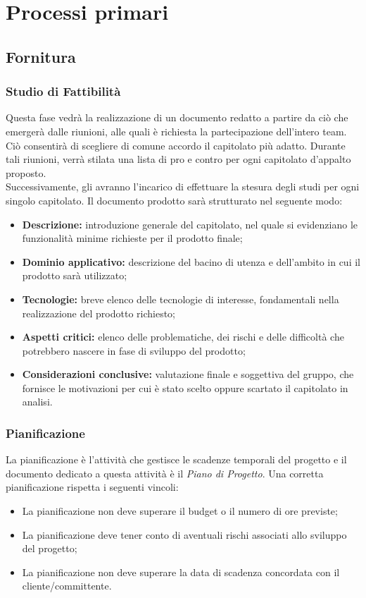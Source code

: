 \newpage
\section{Processi primari}

	\subsection{Fornitura}
		\subsubsection{Studio di Fattibilità}
		Questa fase vedrà la realizzazione di un documento redatto a partire da ciò che emergerà dalle riunioni, alle quali è richiesta la partecipazione dell'intero team. Ciò consentirà di scegliere di comune accordo il capitolato più adatto. Durante tali riunioni, verrà stilata una lista di pro e contro per ogni capitolato d'appalto proposto.\\ Successivamente, gli \textit{\Anas} avranno l'incarico di effettuare la stesura degli studi per ogni singolo capitolato. Il documento prodotto sarà strutturato nel seguente modo:
		\begin{itemize}
		\item \textbf{Descrizione:} introduzione generale del capitolato, nel quale si evidenziano le funzionalità minime richieste per il prodotto finale;
		\item \textbf{Dominio applicativo:} descrizione del bacino di utenza e dell'ambito in cui il prodotto sarà utilizzato;
		\item \textbf{Tecnologie:} breve elenco delle tecnologie di interesse, fondamentali nella realizzazione del prodotto richiesto;
		\item \textbf{Aspetti critici:} elenco delle problematiche, dei rischi e delle difficoltà che potrebbero nascere in fase di sviluppo del prodotto;
		\item \textbf{Considerazioni conclusive:} valutazione finale e soggettiva del gruppo, che fornisce le motivazioni per cui è stato scelto oppure scartato il capitolato in analisi.
		\end{itemize}
		
		\subsubsection{Pianificazione}
		La pianificazione è l'attività che gestisce le scadenze temporali del progetto e il documento dedicato a questa attività è il \textit{Piano di Progetto}. Una corretta pianificazione rispetta i seguenti vincoli:
		\begin{itemize}
			\item La pianificazione non deve superare il budget o il numero di ore previste;
			\item La pianificazione deve tener conto di aventuali rischi associati allo sviluppo del progetto;
			\item La pianificazione non deve superare la data di scadenza concordata con il cliente/committente.
		\end{itemize}
	
